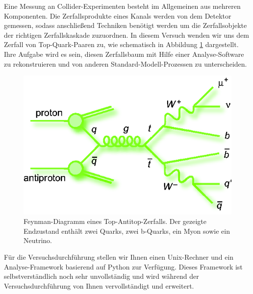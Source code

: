 	Eine Messung an Collider-Experimenten besteht im Allgemeinen aus mehreren Komponenten. Die Zerfallsprodukte eines Kanals werden von dem Detektor gemessen, sodass anschlie\ss{}end Techniken ben\"otigt werden um die Zerfallsobjekte der richtigen Zerfallskaskade zuzuordnen. In diesem Versuch wenden wir uns dem Zerfall von Top-Quark-Paaren zu, wie schematisch in Abbildung \ref{ttbarsemilep} dargestellt. Ihre Aufgabe wird es sein, diesen Zerfallsbaum mit Hilfe einer Analyse-Software zu rekonstruieren und von anderen Standard-Modell-Prozessen zu unterscheiden.
\begin{figure}[h]
\centerline{\includegraphics[scale=0.5]{pics_feynman_ttbar_mujets}}
\caption{Feynman-Diagramm eines Top-Antitop-Zerfalls. Der gezeigte Endzustand enth\"alt zwei Quarks, zwei b-Quarks, ein Myon sowie ein Neutrino.}
\label{ttbarsemilep}
\end{figure}

F\"ur die Versuchsdurchf\"uhrung stellen wir Ihnen einen Unix-Rechner und ein Analyse-Framework basierend auf Python zur Verf\"ugung. Dieses Framework ist selbstverst\"andlich noch sehr
 unvollst\"andig und wird w\"ahrend der Versuchsdurchf\"uhrung von Ihnen vervollst\"andigt und erweitert.

